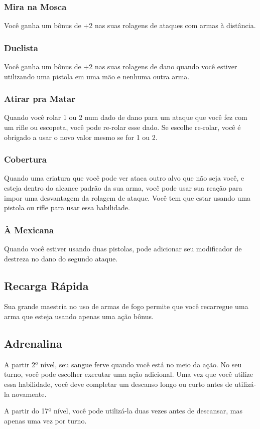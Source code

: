 \documentclass[letterpaper,twocolumn,openany]{dndbook}
\begin{document}
	\subsubsection{Mira na Mosca}
	Você ganha um bônus de +2 nas suas rolagens de ataques com armas à distância.
	
	\subsubsection{Duelista}
	Você ganha um bônus de +2 nas suas rolagens de dano quando você estiver utilizando uma pistola em uma mão e nenhuma outra arma.
	
	\subsubsection{Atirar pra Matar}
	Quando você rolar 1 ou 2 num dado de dano para um ataque que você fez com um rifle ou escopeta, você pode re-rolar esse dado. Se escolhe re-rolar, você é obrigado a usar o novo valor mesmo se for 1 ou 2.
	
	\subsubsection{Cobertura}
	Quando uma criatura que você pode ver ataca outro alvo que não seja você, e esteja dentro do alcance padrão da sua arma, você pode usar sua reação para impor uma desvantagem da rolagem de ataque. Você tem que estar usando uma pistola ou rifle para usar essa habilidade.
	
	\subsubsection{À Mexicana}
	Quando você estiver usando duas pistolas, pode adicionar seu modificador de destreza no dano do segundo ataque.
	
	\subsection{Recarga Rápida}
	Sua grande maestria no uso de armas de fogo permite que você recarregue uma arma que esteja usando apenas uma ação bônus.
	
	\subsection{Adrenalina}
	A partir 2º nível, seu sangue ferve quando você está no meio da ação. No seu turno, você pode escolher executar uma ação adicional. Uma vez que você utilize essa habilidade, você deve completar um descanso longo ou curto antes de utilizá-la novamente.
	\par A partir do 17º nível, você pode utilizá-la duas vezes antes de descansar, mas apenas uma vez por turno.
	
\end{document}
